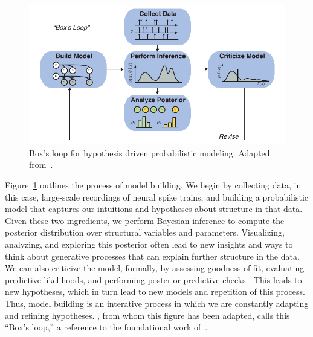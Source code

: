 \begin{figure}[t]
  \centering%
\includegraphics[width=5.5in]{figures/ch1/boxloop} 
\caption[Box's Loop]{Box's loop for hypothesis driven probabilistic modeling.
Adapted from~\citet{blei2014build}.}
\label{fig:boxloop}
\end{figure}

Figure~\ref{fig:boxloop} outlines the process of model building.  We
begin by collecting data, in this case, large-scale recordings of
neural spike trains, and building a probabilistic model that captures
our intuitions and hypotheses about structure in that data. Given
these two ingredients, we perform Bayesian inference to compute the
posterior distribution over structural variables and
parameters. Visualizing, analyzing, and exploring this posterior often
lead to new insights and ways to think about generative processes that
can explain further structure in the data. We can also criticize the
model, formally, by assessing goodness-of-fit, evaluating predictive
likelihoods, and performing posterior predictive checks
\citep{Gelman13}. This leads to new hypotheses, which in turn lead to
new models and repetition of this process.  Thus, model building is an
interative process in which we are constantly adapting and refining
hypotheses.  \citet{blei2014build}, from whom this figure has been
adapted, calls this ``Box's loop,'' a reference to the foundational
work of~\citet{box1980sampling}.



